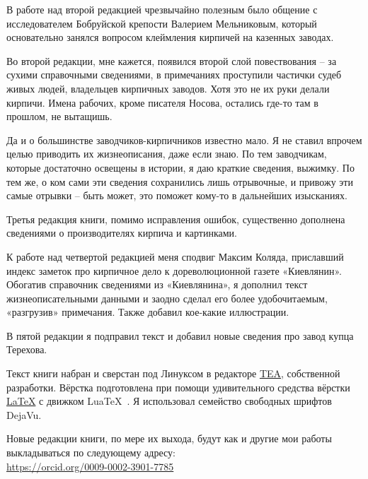 В работе над второй редакцией чрезвычайно полезным было общение с исследователем Бобруйской крепости Валерием Мельниковым, который основательно занялся вопросом клеймления кирпичей на казенных заводах.

Во второй редакции, мне кажется, появился второй слой повествования – за сухими справочными сведениями, в примечаниях проступили частички судеб живых людей, владельцев кирпичных заводов. Хотя это не их руки делали кирпичи. Имена рабочих, кроме писателя Носова, остались где-то там в прошлом, не вытащишь. 

Да и о большинстве заводчиков-кирпичников известно мало. Я не ставил впрочем целью приводить их жизнеописания, даже если знаю. По тем заводчикам, которые достаточно освещены в истории, я даю краткие сведения, выжимку. По тем же, о ком сами эти сведения сохранились лишь отрывочные, и привожу эти самые отрывки – быть может, это поможет кому-то в дальнейших изысканиях.

Третья редакция книги, помимо исправления ошибок, существенно дополнена сведениями о производителях кирпича и картинками.

К работе над четвертой редакцией меня сподвиг Максим Коляда, приславший индекс заметок про кирпичное дело к дореволюционной газете «Киевлянин». Обогатив справочник сведениями из «Киевлянина», я дополнил текст жизнеописательными данными и заодно сделал его более удобочитаемым, «разгрузив» примечания. Также добавил кое-какие иллюстрации.

В пятой редакции я подправил текст и добавил новые сведения про завод купца Терехова.

Текст книги набран и сверстан под Линуксом в редакторе \href{http://semiletov.org/tea}{TEA}, собственной разработки. Вёрстка подготовлена при помощи удивительного средства вёрстки \href{http://www.latex-project.org}{\LaTeX} с движком Lua\TeX~. Я использовал семейство свободных шрифтов DejaVu.

Новые редакции книги, по мере их выхода, будут как и другие мои работы выкладываться по следующему адресу:\\ 

\noindent
\href{https://orcid.org/0009-0002-3901-7785}{https://orcid.org/0009-0002-3901-7785}\\ 

